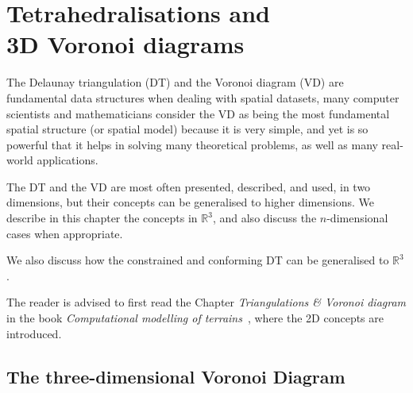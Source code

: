 
\setchapterpreamble[u]{\margintoc}

\graphicspath{{dtvd3d/}}

\newcommand{\Orient}{O\textsc{rient}\xspace}
\newcommand{\Insphere}{I\textsc{n}S\textsc{phere}\xspace}

\chapter[Tetrahedralisations and 3D Voronoi diagrams]{Tetrahedralisations and \\3D Voronoi diagrams}%
\label{chap:dtvd3d}


The Delaunay triangulation (DT) and the Voronoi diagram (VD) are fundamental data structures when dealing with spatial datasets, many computer scientists and mathematicians consider the VD as being the most fundamental spatial structure (or spatial model) because it is very simple, and yet is so powerful that it helps in solving many theoretical problems, as well as many real-world applications.

The DT and the VD are most often presented, described, and used, in two dimensions, but their concepts can be generalised to higher dimensions.
We describe in this chapter the concepts in $\mathbb{R}^{3}$, and also discuss the $n$-dimensional cases when appropriate.%

We also discuss how the constrained and conforming DT can be generalised to $\mathbb{R}^{3}$.

\begin{kaobox}[frametitle=\faExternalLink\ To read or to watch.]
  The reader is advised to first read the Chapter \emph{Triangulations \& Voronoi diagram} in the book \emph{Computational modelling of terrains}~\citep{terrain_book}, where the 2D concepts are introduced.
\end{kaobox}

%
\section[3D Voronoi diagram]{The three-dimensional Voronoi Diagram}

